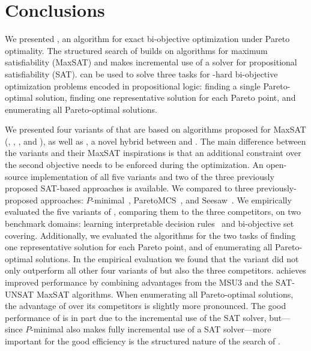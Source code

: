 \chapter{Conclusions\label{chap:conclusion}}

We presented \algname{}, an algorithm for exact bi-objective optimization under Pareto optimality.
The structured search of \algname{} builds on algorithms for maximum satisfiability (MaxSAT) and makes incremental use of a solver for propositional satisfiability (SAT).
\algname{} can be used to solve three tasks for \NP-hard bi-objective optimization problems encoded in propositional logic:
finding a single Pareto-optimal solution, finding one representative solution for each Pareto point, and enumerating all Pareto-optimal solutions.

We presented four variants of \algname{} that are based on algorithms proposed for MaxSAT (\satunsat{}, \unsatsat{}, \msu{}, and \oll{}), as well as \msh{}, a novel hybrid between \msu{} and \satunsat{}.
The main difference between the \algname{} variants and their MaxSAT inspirations is that an additional constraint over the second objective needs to be enforced during the optimization.
An open-source implementation of all five variants and two of the three previously proposed SAT-based approaches is available.
We compared \algname{} to three previously-proposed approaches:
$P$-minimal~\autocite{DBLP:conf/cp/SohBTB17}, ParetoMCS~\autocite{DBLP:conf/ijcai/Terra-NevesLM18a}, and Seesaw~\autocite{DBLP:conf/cp/JanotaMSM21}.
We empirically evaluated the five variants of \algname{}, comparing them to the three competitors, on two benchmark domains: learning interpretable decision rules~\autocite{DBLP:conf/cp/MaliotovM18} and bi-objective set covering.
Additionally, we evaluated the algorithms for the two tasks of finding one representative solution for each Pareto point, and of enumerating all Pareto-optimal solutions.
In the empirical evaluation we found that the \msh{} variant did not only outperform all other four variants of \algname{} but also the three competitors.
\msh{} achieves improved performance by combining advantages from the MSU3 and the SAT-UNSAT MaxSAT algorithms.
When enumerating all Pareto-optimal solutions, the advantage of \algname{} over its competitors is slightly more pronounced.
The good performance of \algname{} is in part due to the incremental use of the SAT solver, but---since $P$-minimal also makes fully incremental use of a SAT solver---more important for the good efficiency is the structured nature of the search of \algname{}.

